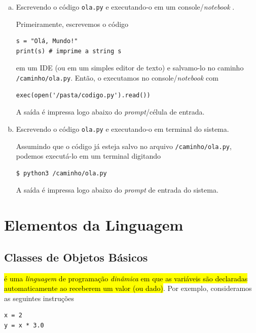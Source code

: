 \documentclass[12pt]{article}
\begin{document}
\begin{ex}
\begin{enumerate}[a)]
  \item Escrevendo o código \verb+ola.py+ e executando-o em um console/\textit{notebook} {\python}.
  
  Primeiramente, escrevemos o código

\begin{lstlisting}
s = "Olá, Mundo!"
print(s) # imprime a string s
\end{lstlisting}

em um IDE (ou em um simples editor de texto) e salvamo-lo no caminho \texttt{/caminho/ola.py}. Então, o executamos no console/\textit{notebook} {\python} com

\begin{lstlisting}
exec(open('/pasta/codigo.py').read())
\end{lstlisting}

A saída é impressa logo abaixo do \textit{prompt}/célula de entrada.
  
  \item Escrevendo o código \verb+ola.py+ e executando-o em terminal do sistema.
  
  Assumindo que o código já esteja salvo no arquivo \texttt{/caminho/ola.py}, podemos executá-lo em um terminal digitando

\begin{lstlisting}
$ python3 /caminho/ola.py
\end{lstlisting}

  A saída é impressa logo abaixo do \textit{prompt} de entrada do sistema.
\end{enumerate}

\end{ex}

\section{Elementos da Linguagem}\label{sec_elem}

\subsection{Classes de Objetos Básicos}

\hl{{\python} é uma \emph{linguagem} de programação \emph{dinâmica} em que as variáveis são declaradas automaticamente ao receberem um valor (ou dado)}. Por exemplo, consideramos as seguintes instruções

\begin{lstlisting}
x = 2
y = x * 3.0
\end{lstlisting}
\end{document}
